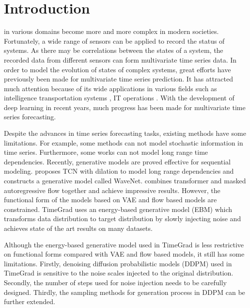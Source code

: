 \IEEEpeerreviewmaketitle

\section{Introduction}
 in various domains become more and more complex in modern societies.  Fortunately, a wide range of sensors can be applied to record the status of systems. As there may be correlations between the states of a system, the recorded data from different sensors can form multivariate time series data. In order to model the evolution of states of complex systems, great efforts have previously been made for multivariate time series prediction. It has attracted much attention because of its wide applications in various fields such as intelligence transportation systems \cite{lana2018road},  IT operations \cite{alexandrov2019gluonts}. With the development of deep learning in recent years, much progress has been made for multivariate time series forecasting.

Despite the advances in time series forecasting tasks, existing methods have some limitations. For example, some methods \cite{su2019robust,shih2019temporal} can not model stochastic information in time series. Furthermore,  some works \cite{salinas2020deepar,wang2019deep} can not model long range time dependencies. Recently, generative models are proved effective for sequential modeling. \cite{oord2016wavenet} proposes TCN with dilation to model long range dependencies and constructs a generative model called WaveNet. \cite{rasul2020multi} combines transformer and masked autoregressive flow together and achieve impressive results. However, the functional form of the models based on VAE and flow based models are constrained. TimeGrad \cite{rasul2021autoregressive} uses an energy-based generative model (EBM) which transforms data distribution to target distribution by slowly injecting noise and achieves state of the art results on many datasets.

Although the energy-based generative model used in TimeGrad is less restrictive on functional forms compared with VAE and flow based models, it still has some limitations. Firstly, denoising diffusion probabilistic models (DDPM) used in TimeGrad is sensitive to the noise scales injected to the original distribution. Secondly, the number of steps used for noise injection needs to be carefully designed. Thirdly, the sampling methods for generation process in DDPM can be further extended.%

